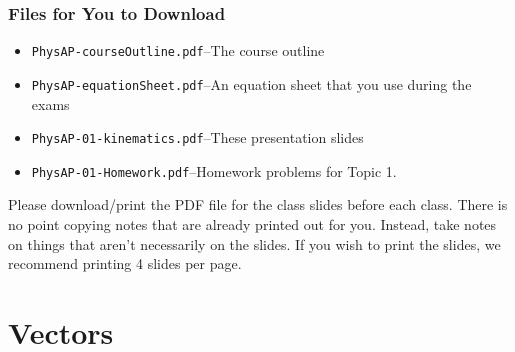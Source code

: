 \documentclass[12pt,compress,aspectratio=169]{beamer}
\begin{document}
\begin{frame}
  \titlepage
\end{frame}

\begin{frame}
  \frametitle{Files for You to Download}
  \begin{itemize}
  \item\texttt{PhysAP-courseOutline.pdf}--The course outline
  \item\texttt{PhysAP-equationSheet.pdf}--An equation sheet that you use during
    the exams
  \item\texttt{PhysAP-01-kinematics.pdf}--These presentation slides
  \item\texttt{PhysAP-01-Homework.pdf}--Homework problems for Topic 1.
  \end{itemize}
  Please download/print the PDF file for the class slides before each class.
  There is no point copying notes that are already printed out for you.
  Instead, take notes on things that aren't necessarily on the slides. If you
  wish to print the slides, we recommend printing 4 slides per page.
\end{frame}



\section{Vectors}
\end{document}
